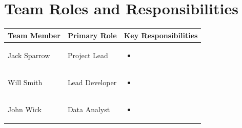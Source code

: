 \section{Team Roles and Responsibilities}\label{sec:team_roles}

\begin{table}[!htb]
\centering
\label{tab:team_roles}
\begin{tabularx}{\textwidth}{@{} l l X @{}}
\toprule
\textbf{Team Member} & \textbf{Primary Role} & \textbf{Key Responsibilities} \\
\midrule
Jack Sparrow & Project Lead &
    \begin{itemize}[leftmargin=*, topsep=0pt, partopsep=0pt, noitemsep]
        \item 
    \end{itemize} \\
\addlinespace

Will Smith & Lead Developer &
    \begin{itemize}[leftmargin=*, topsep=0pt, partopsep=0pt, noitemsep]
        \item 
    \end{itemize} \\
\addlinespace

John Wick & Data Analyst &
    \begin{itemize}[leftmargin=*, topsep=0pt, partopsep=0pt, noitemsep]
        \item 
    \end{itemize} \\
\bottomrule
\end{tabularx}
\end{table}
